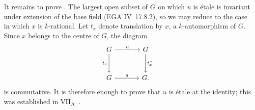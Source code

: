 It remains to prove . The largest open subset of \(G\) on
which \(u\) is étale is invariant under extension of the base field
(EGA IV~17.8.2), so we may reduce to the case in which \(x\) is
\(k\)-rational. Let \(t_x\) denote translation by \(x\), a
\(k\)-automorphism of \(G\). Since \(x\) belongs to the centre of
\(G\), the diagram
\[
\begin{tikzcd}[column sep=large,row sep=large]
G \arrow[r,"u"] \arrow[d,"t_x"'] & G \arrow[d,"t_x^n"] \\
G \arrow[r,"u"] & G .
\end{tikzcd}
\]
is commutative. It is therefore enough to prove that \(u\) is étale
at the identity; this was established in VII\textsubscript{A}~.

